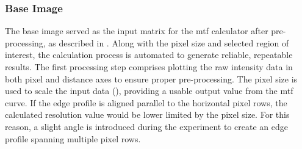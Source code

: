 \documentclass[../../../../main.tex]{subfiles}%
\begin{document}
%
    \subsubsection{Base Image}%
    \label{app:image-processing:modulation-transfer-function:analytical-methods:base-image}%
    The base image served as the input matrix  for the \gls{mtf} calculator after pre-processing, as described in .
    Along with the pixel size  and selected region of interest, the calculation process is automated to generate reliable, repeatable results.
    The first processing step comprises plotting the raw intensity data in both pixel and distance axes to ensure proper pre-processing.
    The pixel size is used to scale the input data (), providing a usable output value from the \gls{mtf} curve.
    If the edge profile is aligned parallel to the horizontal pixel rows, the calculated resolution value would be lower limited by the pixel size.
    For this reason, a slight angle is introduced during the experiment to create an edge profile spanning multiple pixel rows.
\end{document}
